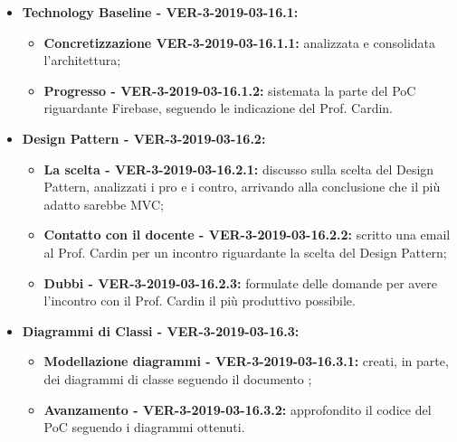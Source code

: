 \documentclass[a4paper, oneside, openany, dvipsnames, table]{article}
\begin{document}
\begin{itemize}
\item \textbf{Technology Baseline - VER-3-2019-03-16.1:} 
	\begin{itemize}
		\item \textbf{Concretizzazione VER-3-2019-03-16.1.1:} analizzata e consolidata l'architettura;
		\item \textbf{Progresso - VER-3-2019-03-16.1.2:} sistemata la parte del PoC riguardante Firebase, seguendo le indicazione del Prof. Cardin.
	\end{itemize}
\item \textbf{Design Pattern - VER-3-2019-03-16.2:}
	\begin{itemize}
	\item  \textbf{La scelta  - VER-3-2019-03-16.2.1:} discusso sulla scelta del Design Pattern, analizzati i pro e i contro, arrivando alla conclusione che il più adatto sarebbe MVC;
	\item \textbf{Contatto con il docente - VER-3-2019-03-16.2.2:} scritto una email al Prof. Cardin per un incontro riguardante la scelta del Design Pattern;
	\item \textbf{Dubbi - VER-3-2019-03-16.2.3:} formulate delle domande per avere l'incontro con il Prof. Cardin il più produttivo possibile. 	
	\end{itemize}
\item \textbf{Diagrammi di Classi - VER-3-2019-03-16.3:}
	\begin{itemize}
		\item \textbf{Modellazione diagrammi - VER-3-2019-03-16.3.1:} creati, in parte, dei diagrammi di classe seguendo il documento \AdR;
		\item \textbf{Avanzamento - VER-3-2019-03-16.3.2:} approfondito il codice del PoC seguendo i diagrammi ottenuti.
		 
	\end{itemize}
\end{itemize}
\end{document}
